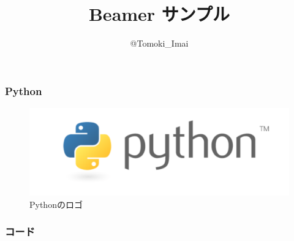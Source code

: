 \documentclass{beamer}
\title{Beamer サンプル}
\author{@Tomoki\_Imai}
\date[2014/04/30]
\begin{document}
\begin{frame}
  \titlepage
\end{frame}

\begin{frame}
  \frametitle{Python}
  \begin{figure}[htb]
  \centering
    \includegraphics[width=1.0\textwidth]{img/python.pdf}
    \caption{Pythonのロゴ}
  \end{figure}
\end{frame}

\begin{frame}
  \frametitle{コード}
  
\end{frame}

\begin{frame}
\end{frame}



\end{document}
